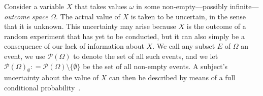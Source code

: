 \documentclass[10pt,a4paper]{paper}
\theoremstyle{definition}
\newcommand{\reals}{\mathbb{R}}
\newcommand{\paths}{\Omega}
\newcommand{\power}{\mathcal{P}(\paths)}
\newcommand{\nonemptypower}{\power_{\emptyset}}
\newcommand{\coloneqq}{:\!=}
\begin{document}
Consider a variable $X$ that takes values $\omega$ in some non-empty---possibly infinite---\emph{outcome space} $\Omega$. The actual value of $X$ is taken to be uncertain, in the sense that it is unknown. This uncertainty may arise because $X$ is the outcome of a random experiment that has yet to be conducted, but it can also simply be a consequence of our lack of information about $X$. 
We call any subset $E$ of $\Omega$ an event, we use $\power$ to denote the set of all such events, and we let $\nonemptypower\coloneqq\power\setminus\{\emptyset\}$ be the set of all non-empty events. 
A subject's uncertainty about the value of $X$ can then be described by means of a full conditional probability~\cite{Dubins:1975ej}.
\end{document}
